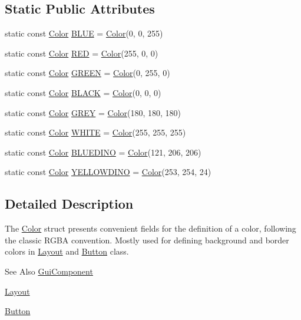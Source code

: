 \subsection*{Static Public Attributes}
\begin{DoxyCompactItemize}
\item 
static const \hyperlink{struct_symp_1_1_color}{Color} \hyperlink{struct_symp_1_1_color_a8585c0abfc6ae44172bcbc7e1bbc54bf}{B\-L\-U\-E} = \hyperlink{struct_symp_1_1_color}{Color}(0, 0, 255)
\item 
static const \hyperlink{struct_symp_1_1_color}{Color} \hyperlink{struct_symp_1_1_color_ade2892a390cd549444d84da71164e67d}{R\-E\-D} = \hyperlink{struct_symp_1_1_color}{Color}(255, 0, 0)
\item 
static const \hyperlink{struct_symp_1_1_color}{Color} \hyperlink{struct_symp_1_1_color_af8e6c9ee96133ee641e9b48a1eae788b}{G\-R\-E\-E\-N} = \hyperlink{struct_symp_1_1_color}{Color}(0, 255, 0)
\item 
static const \hyperlink{struct_symp_1_1_color}{Color} \hyperlink{struct_symp_1_1_color_a8a38032122222aad1e32aae688d27a23}{B\-L\-A\-C\-K} = \hyperlink{struct_symp_1_1_color}{Color}(0, 0, 0)
\item 
static const \hyperlink{struct_symp_1_1_color}{Color} \hyperlink{struct_symp_1_1_color_ae40a5f0273adf627d6ff49fa0e5669d8}{G\-R\-E\-Y} = \hyperlink{struct_symp_1_1_color}{Color}(180, 180, 180)
\item 
static const \hyperlink{struct_symp_1_1_color}{Color} \hyperlink{struct_symp_1_1_color_a501e4889d9f64917b89b762de9f2e200}{W\-H\-I\-T\-E} = \hyperlink{struct_symp_1_1_color}{Color}(255, 255, 255)
\item 
static const \hyperlink{struct_symp_1_1_color}{Color} \hyperlink{struct_symp_1_1_color_aaeb71736387c37c7df2b0ea9b0cc6417}{B\-L\-U\-E\-D\-I\-N\-O} = \hyperlink{struct_symp_1_1_color}{Color}(121, 206, 206)
\item 
static const \hyperlink{struct_symp_1_1_color}{Color} \hyperlink{struct_symp_1_1_color_a53e70f54d10aa2f707e2f0f97b33fde7}{Y\-E\-L\-L\-O\-W\-D\-I\-N\-O} = \hyperlink{struct_symp_1_1_color}{Color}(253, 254, 24)
\end{DoxyCompactItemize}


\subsection{Detailed Description}
The \hyperlink{struct_symp_1_1_color}{Color} struct presents convenient fields for the definition of a color, following the classic R\-G\-B\-A convention. Mostly used for defining background and border colors in \hyperlink{class_symp_1_1_layout}{Layout} and \hyperlink{class_symp_1_1_button}{Button} class. \begin{DoxySeeAlso}{See Also}
\hyperlink{class_symp_1_1_gui_component}{Gui\-Component} 

\hyperlink{class_symp_1_1_layout}{Layout} 

\hyperlink{class_symp_1_1_button}{Button} 
\end{DoxySeeAlso}


